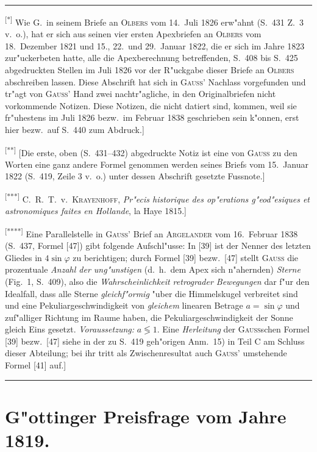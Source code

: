 \documentclass[12pt,a4paper]{article}
\theoremstyle{plain}
\theoremstyle{definition}
\theoremstyle{remark}
\newcommand{\besc}[1]{\textsc{#1}}
\begin{document}
\rule{\textwidth}{0.4pt}
{\small
\textsuperscript{[*]} Wie G.\ in seinem Briefe an \besc{Olbers} vom 14.\ Juli 1826 erw"ahnt (S.\ 431 Z.\ 3 v.\ o.), hat er sich aus seinen vier ersten \glq{}Apexbriefen\grq{} an \besc{Olbers} vom 18.\ Dezember 1821 und 15., 22.\ und 29.\ Januar 1822, die er sich im Jahre 1823 zur"uckerbeten hatte, alle die Apexberechnung betreffenden, S.\ 408 bis S.\ 425 abgedruckten Stellen im Juli 1826 vor der R"uckgabe dieser Briefe an \besc{Olbers} abschreiben lassen. Diese Abschrift hat sich in \textsc{Gau\ss{}'} Nachlass vorgefunden und tr"agt von \textsc{Gau\ss{}'} Hand zwei nachtr"agliche, in den Originalbriefen nicht vorkommende Notizen. Diese Notizen, die nicht datiert sind, kommen, weil sie fr"uhestens im Juli 1826 bezw.\ im Februar 1838 geschrieben sein k"onnen, erst hier bezw.\ auf S.\ 440 zum Abdruck.]

\textsuperscript{[**]} [Die erste, oben (S.\ 431--432) abgedruckte Notiz ist eine von \textsc{Gauss} zu den Worten \glq{}eine ganz andere Formel genommen werden\grq{} seines Briefs vom 15.\ Januar 1822 (S.\ 419, Zeile 3 v.\ o.) unter dessen Abschrift gesetzte Fussnote.]

\textsuperscript{[***]} C.\ R.\ T.\ v.\ \besc{Krayenhoff}, {\itshape Pr"ecis historique des op"erations g"eod"esiques et astronomiques faites en Hollande}, la Haye 1815.]

\textsuperscript{[****]} Eine Parallelstelle in \textsc{Gauss}' Brief an \textsc{Argelander} vom 16.\ Februar 1838 (S.\ 437, Formel [47]) gibt folgende Aufschl"usse: In [39] ist der Nenner des letzten Gliedes in $4\sin\varphi$ zu berichtigen; durch Formel [39] bezw.\ [47] stellt \textsc{Gauss} die prozentuale {\itshape Anzahl der \glq{}ung"unstigen\grq{}} (d.\ h.\ dem Apex sich n"ahernden) {\itshape Sterne} (Fig.\ 1, S.\ 409), also die {\itshape Wahrscheinlichkeit retrograder Bewegungen} dar f"ur den Idealfall, dass alle Sterne {\itshape gleichf"ormig} "uber die Himmelskugel verbreitet sind und eine Pekuliargeschwindigkeit von {\itshape gleichem} linearen Betrage $a = \sin\varphi$ und zuf"alliger Richtung im Raume haben, die Pekuliargeschwindigkeit der Sonne gleich Eins gesetzt. {\itshape Voraussetzung:} $a \lessgtr 1$. Eine {\itshape Herleitung} der \textsc{Gau\ss}schen Formel [39] bezw.\ [47] siehe in der zu S.\ 419 geh"origen Anm.\ 15) in Teil C am Schluss dieser Abteilung; bei ihr tritt als Zwischenresultat auch \textsc{Gau\ss{}'} umstehende Formel [41] auf.]
}
\rule{\textwidth}{0.4pt}


\newpage
\section*{G"ottinger Preisfrage vom Jahre 1819.}
\end{document}
